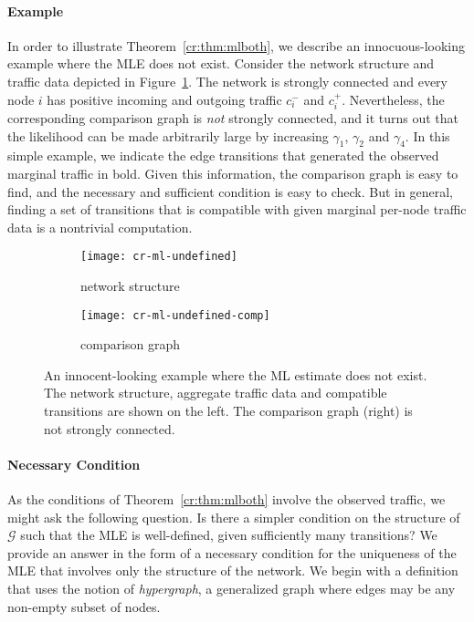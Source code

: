 \paragraph{Example}
In order to illustrate Theorem~\ref{cr:thm:mlboth}, we describe an innocuous-looking example where the MLE does not exist.
Consider the network structure and traffic data depicted in Figure~\ref{cr:fig:badexample}.
The network is strongly connected and every node $i$ has positive incoming and outgoing traffic $c^-_i$ and $c^+_i$.
Nevertheless, the corresponding comparison graph is \emph{not} strongly connected, and it turns out that the likelihood can be made arbitrarily large by increasing $\gamma_1$, $\gamma_2$ and $\gamma_4$.
In this simple example, we indicate the edge transitions that generated the observed marginal traffic in bold.
Given this information, the comparison graph is easy to find, and the necessary and sufficient condition is easy to check.
But in general, finding a set of transitions that is compatible with given marginal per-node traffic data is a nontrivial computation.

\begin{figure}
  \begin{subfigure}{.49\textwidth}
    \centering
    \texttt{[image: cr-ml-undefined]}
    \caption{network structure}
  \end{subfigure}%
  \begin{subfigure}{.49\textwidth}
    \centering
    \texttt{[image: cr-ml-undefined-comp]}
    \caption{comparison graph}
  \end{subfigure}
  \caption{An innocent-looking example where the ML estimate does not exist.
  The network structure, aggregate traffic data and compatible transitions are shown on the left.
  The comparison graph (right) is not strongly connected.}
  \label{cr:fig:badexample}
\end{figure}

\paragraph{Necessary Condition}
As the conditions of Theorem~\ref{cr:thm:mlboth} involve the observed traffic, we might ask the following question.
Is there a simpler condition on the structure of $\mathcal{G}$ such that the MLE is well-defined, given sufficiently many transitions?
We provide an answer in the form of a necessary condition for the uniqueness of the MLE that involves only the structure of the network.
We begin with a definition that uses the notion of \emph{hypergraph}, a generalized graph where edges may be any non-empty subset of nodes.

